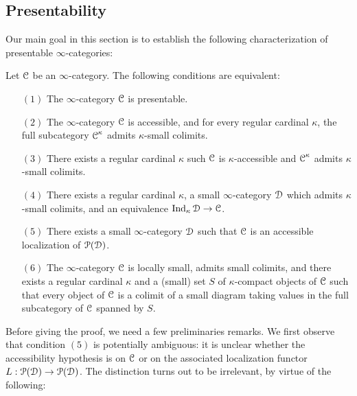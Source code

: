 \setcounter{theorem}{0}
\subsection{Presentability}\label{presint}

Our main goal in this section is to establish the following characterization of presentable $\infty$-categories:

\begin{theorem}\label{pretop}
Let $\operatorname{\mathcal{C}}$ be an $\infty$-category. The following conditions are
equivalent:

\begin{itemize}
\item[$(1)$] The $\infty$-category $\operatorname{\mathcal{C}}$ is presentable.

\item[$(2)$] The $\infty$-category $\operatorname{\mathcal{C}}$ is accessible, and for every
regular cardinal $\kappa$, the full subcategory $\operatorname{\mathcal{C}}^{\kappa}$ admits $\kappa$-small colimits.

\item[$(3)$] There exists a regular cardinal $\kappa$ such $\operatorname{\mathcal{C}}$ is $\kappa$-accessible
and $\operatorname{\mathcal{C}}^{\kappa}$ admits $\kappa$-small colimits.

\item[$(4)$] There exists a regular cardinal $\kappa$, a small $\infty$-category $\operatorname{\mathcal{D}}$ which
admits $\kappa$-small colimits, and an equivalence $\operatorname{Ind}_{\kappa} \operatorname{\mathcal{D}} \rightarrow \operatorname{\mathcal{C}}$.

\item[$(5)$] There exists a small $\infty$-category $\operatorname{\mathcal{D}}$ such that $\operatorname{\mathcal{C}}$
is an accessible localization of $\operatorname{\mathcal{P}}(\operatorname{\mathcal{D}})$.

\item[$(6)$] The $\infty$-category $\operatorname{\mathcal{C}}$ is locally small, admits small colimits, and there
exists a regular cardinal $\kappa$ and a (small) set $S$ of $\kappa$-compact objects of $\operatorname{\mathcal{C}}$ such that every object of $\operatorname{\mathcal{C}}$ is a colimit of a small diagram taking values in the full subcategory of $\operatorname{\mathcal{C}}$ spanned by $S$.
\end{itemize}
\end{theorem}

Before giving the proof, we need a few preliminaries remarks. We first observe that condition $(5)$ is potentially ambiguous: it is unclear whether the accessibility hypothesis is on $\operatorname{\mathcal{C}}$ or on the associated localization functor $L: \operatorname{\mathcal{P}}(\operatorname{\mathcal{D}}) \rightarrow \operatorname{\mathcal{P}}(\operatorname{\mathcal{D}})$. The distinction turns out to be irrelevant, by virtue of the following:

